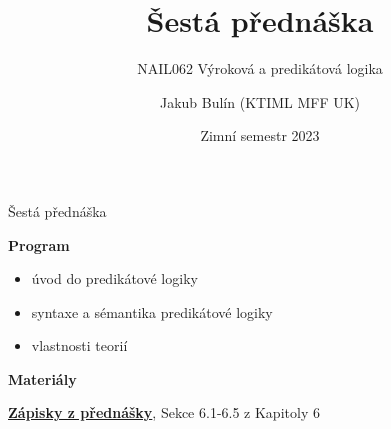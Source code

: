 \documentclass{beamer}
\title{Šestá přednáška}
\subtitle{NAIL062 Výroková a predikátová logika}
\author{Jakub Bulín (KTIML MFF UK)}
\date{Zimní semestr 2023}
\begin{document}
\frame{\titlepage}


\begin{frame}{Šestá přednáška}

    \textbf{Program}
        \begin{itemize}
            \item úvod do predikátové logiky
            \item syntaxe a sémantika predikátové logiky
            \item vlastnosti teorií
        \end{itemize}

    \textbf{Materiály}

        \href{https://github.com/jbulin-mff-uk/nail062/raw/main/lecture/lecture-notes/lecture-notes.pdf}{\alert{\textbf{Zápisky z přednášky}}}, Sekce 6.1-6.5 z Kapitoly 6

\end{frame}
\end{document}
